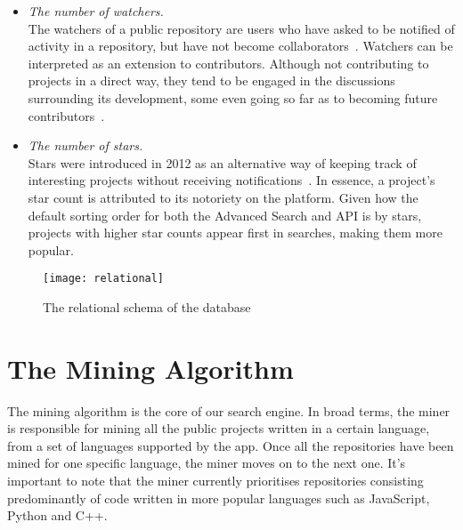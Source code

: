 \begin{itemize}
    \item \textit{The number of watchers.}
    \\The watchers of a public repository are users who have asked to be notified of activity in a repository, but have not become collaborators~\cite{METRICSWATCHERS}. Watchers can be interpreted as an extension to contributors. Although not contributing to projects in a direct way, they tend to be engaged in the discussions surrounding its development, some even going so far as to becoming future contributors~\cite{WATCHERS14}.
    \item \textit{The number of stars.}
    \\Stars were introduced in 2012 as an alternative way of keeping track of interesting projects without receiving notifications~\cite{STARS}. In essence, a project's star count is attributed to its notoriety on the platform. Given how the default sorting order for both the Advanced Search and API is by stars, projects with higher star counts appear first in searches, making them more popular.
\end{itemize}


\begin{figure}[ht!]
    \centering
    \texttt{[image: relational]}
    \caption{The relational schema of the database}
\end{figure}

\newpage
\section{The Mining Algorithm}

The mining algorithm is the core of our search engine.
In broad terms, the miner is responsible for mining all the public projects written in a certain language, from a set of languages supported by the app.
Once all the repositories have been mined for one specific language, the miner moves on to the next one.
It's important to note that the miner currently prioritises repositories consisting predominantly of code written in more popular languages such as JavaScript, Python and C++.

